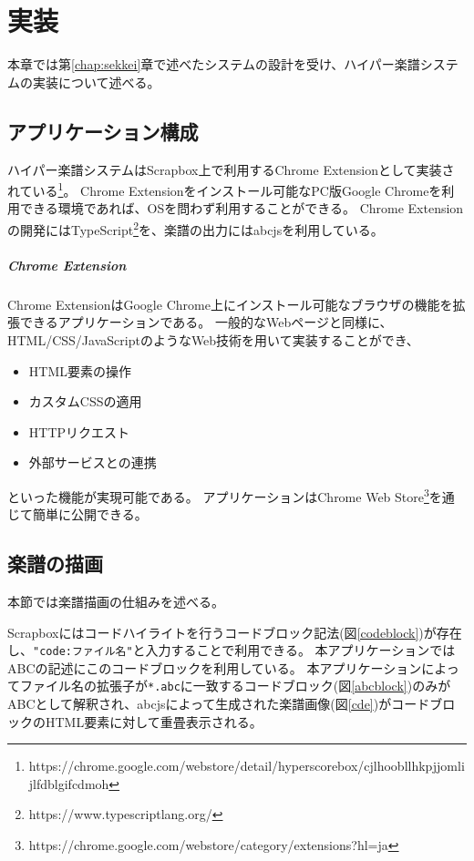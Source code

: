 \chapter{実装}
\label{chap:jissou}

本章では第\ref{chap:sekkei}章で述べたシステムの設計を受け、ハイパー楽譜システムの実装について述べる。

\newpage

\section{アプリケーション構成}
ハイパー楽譜システムはScrapbox上で利用するChrome Extensionとして実装されている\footnote{\textsf{https://chrome.google.com/webstore/detail/hyperscorebox/cjlhoobllhkpjjomlijlfdblgifcdmoh}}。
Chrome Extensionをインストール可能なPC版Google Chromeを利用できる環境であれば、OSを問わず利用することができる。
Chrome Extensionの開発にはTypeScript\footnote{\textsf{https://www.typescriptlang.org/}}を、楽譜の出力にはabcjsを利用している。

\paragraph*{Chrome Extension}
Chrome ExtensionはGoogle Chrome上にインストール可能なブラウザの機能を拡張できるアプリケーションである。
一般的なWebページと同様に、HTML/CSS/JavaScriptのようなWeb技術を用いて実装することができ、
\begin{itemize}
    \item HTML要素の操作
    \item カスタムCSSの適用
    \item HTTPリクエスト
    \item 外部サービスとの連携
\end{itemize}といった機能が実現可能である。
アプリケーションはChrome Web Store\footnote{\textsf{https://chrome.google.com/webstore/category/extensions?hl=ja}}を通じて簡単に公開できる。

\section{楽譜の描画}
本節では楽譜描画の仕組みを述べる。

Scrapboxにはコードハイライトを行うコードブロック記法(図\ref{codeblock})が存在し、\texttt{"code:{ファイル名}"}と入力することで利用できる。
本アプリケーションではABCの記述にこのコードブロックを利用している。
本アプリケーションによってファイル名の拡張子が\texttt{*.abc}に一致するコードブロック(図\ref{abcblock})のみがABCとして解釈され、abcjsによって生成された楽譜画像(図\ref{cde})がコードブロックのHTML要素に対して重畳表示される。

